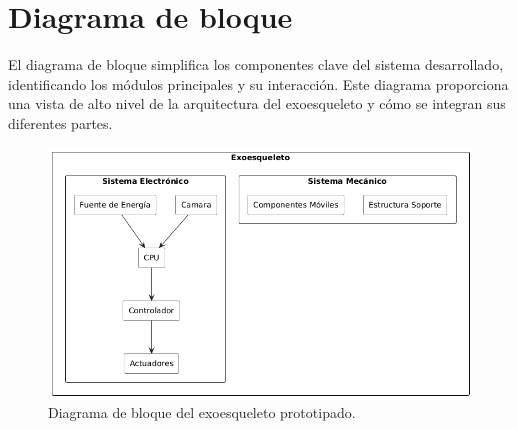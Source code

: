 \section{Diagrama de bloque}
El diagrama de bloque simplifica los componentes clave del sistema desarrollado, identificando los módulos principales y su interacción. Este diagrama proporciona una vista de alto nivel de la arquitectura del exoesqueleto y cómo se integran sus diferentes partes.
\begin{figure}[H]
    \centering
    \includegraphics[width=1\textwidth]{img/DiagramaBloque.png}
    \caption{Diagrama de bloque del exoesqueleto prototipado.}
    \label{fig:flowchart3}
\end{figure}